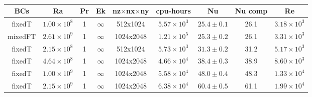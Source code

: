 \documentclass[aps, pre, onecolumn, nofootinbib, notitlepage, groupedaddress, amsfonts, amssymb, amsmath, longbibliography]{revtex4-1}
\begin{document}
\begin{table}[ht]
\caption{
}
\setlength{\tabcolsep}{12pt}
\label{table:speed}
\begin{center}
\begin{tabularx}{\textwidth}{c c c c c c c c c}
\hline																	
BCs	&	Ra	&	Pr	&	Ek	&	nz$\times$nx$\times$ny	&	cpu-hours &	Nu	&	Nu comp	&	Re \\
\hline
fixedT	&	$1.00 \times 10^8$	&	1	&	$\infty$	&	512x1024	&	$5.57 \times 10^3$	&	$25.4 \pm 0.1$	&	26.1	&	$3.18 \times 10^3$ \\
mixedFT	&	$2.61 \times 10^9$	&	1	&	$\infty$	&	1024x2048	&	$1.21 \times 10^5$	&	$25.3 \pm 0.2$	&	26.1	&	$3.31 \times 10^3$ \\
fixedT	&	$2.15 \times 10^8$	&	1	&	$\infty$	&	512x1024	&	$5.73 \times 10^3$	&	$31.3 \pm 0.2$	&	31.2	&	$5.17 \times 10^3$ \\
fixedT	&	$4.64 \times 10^8$	&	1	&	$\infty$	&	1024x2048	&	$4.66 \times 10^4$	&	$38.4 \pm 0.3$	&	38.9	&	$8.60 \times 10^3$ \\
fixedT	&	$1.00 \times 10^9$	&	1	&	$\infty$	&	1024x2048	&	$5.58 \times 10^4$	&	$48.0 \pm 0.4$	&	48.3	&	$1.33 \times 10^4$ \\
fixedT	&	$2.15 \times 10^9$	&	1	&	$\infty$	&	1024x2048	&	$6.38 \times 10^4$	&	$60.4 \pm 0.5$	&	61.1	&	$1.99 \times 10^4$ \\
\hline																	
\end{tabularx}
\end{center}
\end{table}
\end{document}
